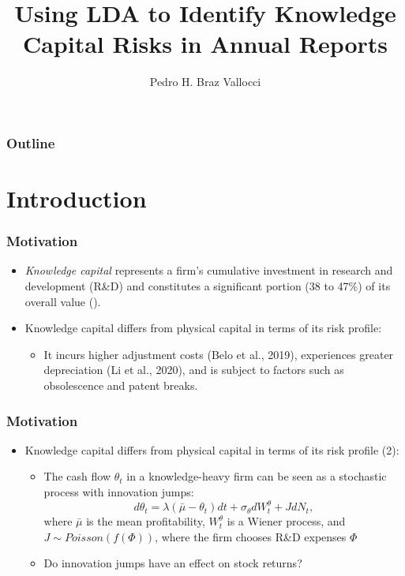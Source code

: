 \documentclass{beamer}
\title[] %
{Using LDA to Identify Knowledge Capital Risks in Annual Reports}
\author[Pedro Vallocci] %
{Pedro H. Braz Vallocci\inst{1}}
\institute[UCSC] %
{
  \inst{1}%
  University of California, Santa Cruz
 }
\begin{document}
\frame{\titlepage}

\begin{frame}
\frametitle{Outline}
\tableofcontents
\end{frame}

\section{Introduction}
\begin{frame}
\frametitle{Motivation}
\begin{itemize}	
\item \textit{Knowledge capital} represents a firm's cumulative investment in research and development (R\&D) and constitutes a significant portion (38 to 47\%) of its overall value (\cite{Belo2019-iz}).
\item Knowledge capital differs from physical capital in terms of its risk profile:
\begin{itemize}
\item It incurs higher adjustment costs (Belo et al., 2019), experiences greater depreciation (Li et al., 2020), and is subject to factors such as obsolescence and patent breaks.
\end{itemize}
\end{itemize}
\end{frame}

\begin{frame}
\frametitle{Motivation}
\begin{itemize}	
\item Knowledge capital differs from physical capital in terms of its risk profile (2):
\begin{itemize}
\item The cash flow $\theta_t$ in a knowledge-heavy firm can be seen as a stochastic process with innovation jumps: \citep{Andrei2019-bh}  
\begin{equation}
	d \theta_t=\lambda\left(\bar{\mu}-\theta_t\right) d t+\sigma_\theta d W_t^\theta+J d N_t, 
\end{equation}
where $\bar{\mu}$ is the mean profitability, $W_t^\theta$ is a Wiener process, and $J \sim Poisson(f(\Phi))$, where the firm chooses R\&D expenses $\Phi$
\item Do innovation jumps have an effect on stock returns?
\end{itemize}
\end{itemize}
\end{frame}
\end{document}
